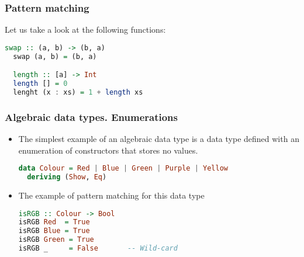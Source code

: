 \documentclass[10pt,pdf,utf8,russian,aspectratio=169]{beamer}
\begin{document}
\begin{frame}[fragile]
\frametitle{Pattern matching}
  Let us take a look at the following functions:
  \begin{lstlisting}[language=Haskell]
  swap :: (a, b) -> (b, a)
  swap (a, b) = (b, a)

  length :: [a] -> Int
  length [] = 0
  lenght (x : xs) = 1 + length xs
  \end{lstlisting}

\end{frame}

\begin{frame}[fragile]
\frametitle{Algebraic data types. Enumerations}

\begin{itemize}
\item The simplest example of an algebraic data type is a data type defined with an enumeration of constructors that stores no values.

\begin{lstlisting}[language=Haskell]
data Colour = Red | Blue | Green | Purple | Yellow
  deriving (Show, Eq)
\end{lstlisting}

\item The example of pattern matching for this data type

\begin{lstlisting}[language=Haskell]
isRGB :: Colour -> Bool
isRGB Red  = True
isRGB Blue = True
isRGB Green = True
isRGB _     = False       -- Wild-card
\end{lstlisting}
\end{itemize}
\end{frame}
\end{document}
